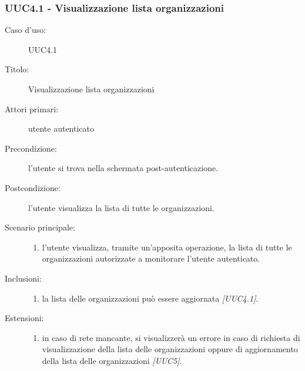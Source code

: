 \documentclass[../analisi-dei-requisiti.tex]{subfiles}
\begin{document}
\subsubsection{UUC4.1 - Visualizzazione lista organizzazioni}%
\label{subsub:UUC4.1utente}
\begin{description}
  \item[Caso d’uso:] UUC4.1
  \item[Titolo:] Visualizzazione lista organizzazioni
  \item[Attori primari:] utente autenticato
  \item[Precondizione:] l'utente si trova nella schermata post-autenticazione.
  \item[Postcondizione:] l'utente visualizza la lista di tutte le organizzazioni.
  \item[Scenario principale:]
        \begin{enumerate}
          \item l'utente visualizza, tramite un'apposita operazione, la lista di tutte le organizzazioni autorizzate a monitorare l'utente autenticato.
        \end{enumerate}
  \item[Inclusioni:]
        \begin{enumerate}
          \item la lista delle organizzazioni può essere aggiornata \emph{[UUC4.1]}.
        \end{enumerate}
  \item[Estensioni:]
        \begin{enumerate}
          \item in caso di rete mancante, si visualizzerà un errore in caso di richiesta di visualizzazione della lista delle organizzazioni
                oppure di aggiornamento della lista delle organizzazioni \emph{[UUC5]}.
        \end{enumerate}
\end{description}

\end{document}
